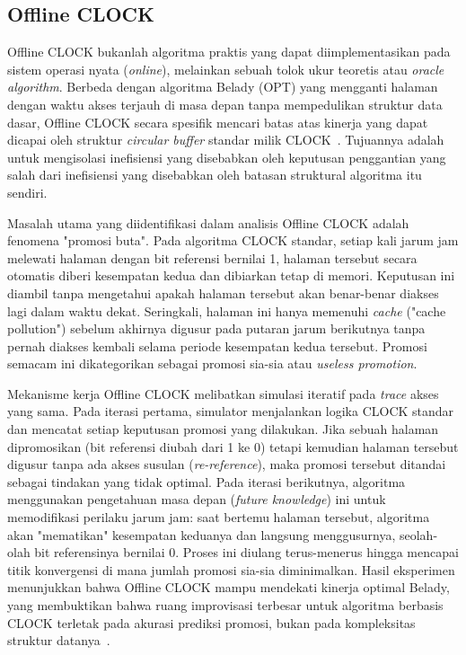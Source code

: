 \subsection{Offline CLOCK}
Offline CLOCK bukanlah algoritma praktis yang dapat diimplementasikan
pada sistem operasi nyata (\textit{online}), melainkan sebuah tolok
ukur teoretis atau \textit{oracle algorithm}.
Berbeda dengan algoritma Belady (OPT) yang mengganti halaman dengan
waktu akses terjauh di masa depan tanpa mempedulikan struktur data
dasar, Offline CLOCK secara spesifik mencari batas atas kinerja yang
dapat dicapai oleh struktur \textit{circular buffer} standar milik
CLOCK~\cite{chen2025lazy}.
Tujuannya adalah untuk mengisolasi inefisiensi yang disebabkan oleh
keputusan penggantian yang salah dari inefisiensi yang disebabkan
oleh batasan struktural algoritma itu sendiri.

Masalah utama yang diidentifikasi dalam analisis Offline CLOCK adalah
fenomena "promosi buta".
Pada algoritma CLOCK standar, setiap kali jarum jam melewati halaman
dengan bit referensi bernilai 1, halaman tersebut secara otomatis
diberi kesempatan kedua dan dibiarkan tetap di memori.
Keputusan ini diambil tanpa mengetahui apakah halaman tersebut akan
benar-benar diakses lagi dalam waktu dekat.
Seringkali, halaman ini hanya memenuhi \textit{cache} ("cache
pollution") sebelum akhirnya digusur pada putaran jarum berikutnya
tanpa pernah diakses kembali selama periode kesempatan kedua tersebut.
Promosi semacam ini dikategorikan sebagai promosi sia-sia atau
\textit{useless promotion}.

Mekanisme kerja Offline CLOCK melibatkan simulasi iteratif pada
\textit{trace} akses yang sama.
Pada iterasi pertama, simulator menjalankan logika CLOCK standar dan
mencatat setiap keputusan promosi yang dilakukan.
Jika sebuah halaman dipromosikan (bit referensi diubah dari 1 ke 0)
tetapi kemudian halaman tersebut digusur tanpa ada akses susulan
(\textit{re-reference}), maka promosi tersebut ditandai sebagai
tindakan yang tidak optimal.
Pada iterasi berikutnya, algoritma menggunakan pengetahuan masa depan
(\textit{future knowledge}) ini untuk memodifikasi perilaku jarum
jam: saat bertemu halaman tersebut, algoritma akan "mematikan"
kesempatan keduanya dan langsung menggusurnya, seolah-olah bit
referensinya bernilai 0.
Proses ini diulang terus-menerus hingga mencapai titik konvergensi di
mana jumlah promosi sia-sia diminimalkan.
Hasil eksperimen menunjukkan bahwa Offline CLOCK mampu mendekati
kinerja optimal Belady, yang membuktikan bahwa ruang improvisasi
terbesar untuk algoritma berbasis CLOCK terletak pada akurasi
prediksi promosi, bukan pada kompleksitas struktur datanya~\cite{chen2025lazy}.

